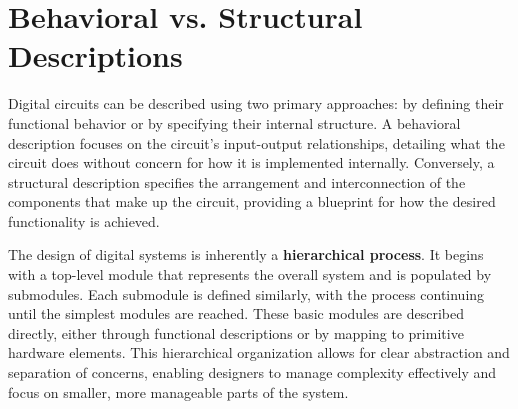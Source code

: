 

\section{Behavioral vs. Structural Descriptions}
Digital circuits can be described using two primary approaches: by defining their functional behavior or by specifying their internal structure. A behavioral description focuses on the circuit's input-output relationships, detailing what the circuit does without concern for how it is implemented internally. Conversely, a structural description specifies the arrangement and interconnection of the components that make up the circuit, providing a blueprint for how the desired functionality is achieved. 

The design of digital systems is inherently a \textbf{hierarchical process}. It begins with a top-level module that represents the overall system and is populated by submodules. Each submodule is defined similarly, with the process continuing until the simplest modules are reached. These basic modules are described directly, either through functional descriptions or by mapping to primitive hardware elements. This hierarchical organization allows for clear abstraction and separation of concerns, enabling designers to manage complexity effectively and focus on smaller, more manageable parts of the system.

